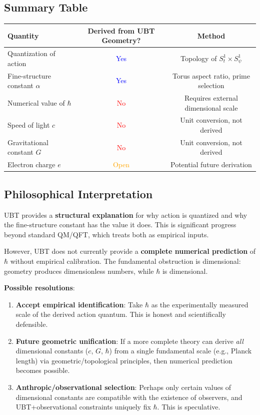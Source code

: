 \documentclass[12pt]{article}
\begin{document}
\subsection{Summary Table}

\begin{center}
\begin{tabular}{|l|c|c|}
\hline
\textbf{Quantity} & \textbf{Derived from UBT Geometry?} & \textbf{Method} \\
\hline
Quantization of action & \textcolor{blue}{Yes} & Topology of $S^1_t \times S^1_\psi$ \\
Fine-structure constant $\alpha$ & \textcolor{blue}{Yes} & Torus aspect ratio, prime selection \\
Numerical value of $\hbar$ & \textcolor{red}{No} & Requires external dimensional scale \\
Speed of light $c$ & \textcolor{red}{No} & Unit conversion, not derived \\
Gravitational constant $G$ & \textcolor{red}{No} & Unit conversion, not derived \\
Electron charge $e$ & \textcolor{orange}{Open} & Potential future derivation \\
\hline
\end{tabular}
\end{center}

\subsection{Philosophical Interpretation}

UBT provides a \textbf{structural explanation} for why action is quantized and why the fine-structure constant has the value it does. This is significant progress beyond standard QM/QFT, which treats both as empirical inputs.

However, UBT does not currently provide a \textbf{complete numerical prediction} of $\hbar$ without empirical calibration. The fundamental obstruction is dimensional: geometry produces dimensionless numbers, while $\hbar$ is dimensional.

\textbf{Possible resolutions}:

\begin{enumerate}
\item \textbf{Accept empirical identification}: Take $\hbar$ as the experimentally measured scale of the derived action quantum. This is honest and scientifically defensible.

\item \textbf{Future geometric unification}: If a more complete theory can derive \emph{all} dimensional constants ($c$, $G$, $\hbar$) from a single fundamental scale (e.g., Planck length) via geometric/topological principles, then numerical prediction becomes possible.

\item \textbf{Anthropic/observational selection}: Perhaps only certain values of dimensional constants are compatible with the existence of observers, and UBT+observational constraints uniquely fix $\hbar$. This is speculative.
\end{enumerate}
\end{document}

